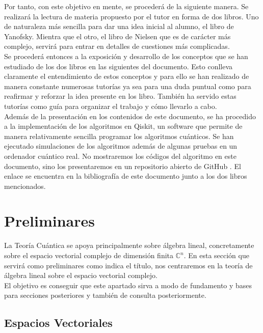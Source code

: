 \documentclass[a4paper]{article}
\numberwithin{equation}{section}
\begin{document}
Por tanto, con este objetivo en mente, se procederá de la siguiente manera. Se realizará la lectura de materia propuesto por el tutor en forma de dos libros. Uno de naturaleza más sencilla para dar una idea inicial al alumno, el libro de Yanofsky\cite{yanofsky2008quantum}. Mientra que el otro, el libro de Nielsen \cite{nielsen2001quantum} que es de carácter más complejo, servirá para entrar en detalles de cuestiones más complicadas.\\
\linebreak
Se procederá entonces a la exposición y desarrollo de los conceptos que se han estudiado de los dos libros en las siguientes del documento. Esto conlleva claramente el entendimiento de estos conceptos y para ello se han realizado de manera constante numerosas tutorías ya sea para una duda puntual como para reafirmar y reforzar la idea presente en los libro. También ha servido estas tutorías como guía para organizar el trabajo y cómo llevarlo a cabo.\\
\linebreak
Además de la presentación en los contenidos de este documento, se ha procedido a la implementación de los algoritmos en Qiskit, un software que permite de manera relativamente sencilla programar los algoritmos cuánticos. Se han ejecutado simulaciones de los algoritmos además de algunas pruebas en un ordenador cuántico real. No mostraremos los códigos del algoritmo en este documento, sino los presentaremos en un repositorio abierto de GitHub \cite{chen2023github}. El enlace se encuentra en la bibliografía de este documento junto a los dos libros mencionados.\\


\newpage

\section{Preliminares}

La Teoría Cuántica se apoya principalmente sobre álgebra lineal, concretamente sobre el espacio vectorial complejo de dimensión finita $\mathbb{C}^n$.
En esta sección que servirá como preliminares como indica el título, nos centraremos en la teoría de álgebra lineal sobre el espacio vectorial complejo.\\
El objetivo es conseguir que este apartado sirva a modo de fundamento y bases para secciones posteriores y también de consulta posteriormente.

\subsection{Espacios Vectoriales}
\end{document}
